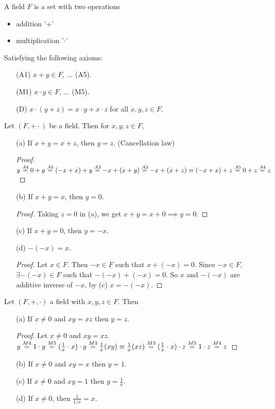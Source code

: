 \documentclass[]{article}
\begin{document}
\begin{definition}
	[Field] A field $F$ is a set with two operations
	\begin{itemize}
		\item addition '+'
		\item multiplication '$\cdot$'
	\end{itemize}
	Satisfying the following axioms:
	\begin{enumerate}
		\item[(A1)] $x+y \in F$, $\dots$ (A5).
		\item[(M1)] $x\cdot y \in F$, $\dots$ (M5).
		\item[(D)] $x\cdot(y+z) = x\cdot y + x\cdot z$ for all $x,y,z\in F$.
	\end{enumerate}
\end{definition}

\begin{proposition}
	\label{prop1.14}
	Let $(F,+\cdot)$ be a field. Then for $x,y,z\in F$,
	\begin{enumerate}
		\item[(a)] If $x+y = x+z$, then $y = z$. (Cancellation law)
		\begin{proof}
			$y \overset{A4}{=} 0+y \overset{A5}{=} (-x+x) + y \overset{A3}{=} -x+(x+y) \overset{A3}{=} -x+(x+z)\equiv (-x+x)+z \overset{A5}{=} 0+z \overset{A4}{=} z$
		\end{proof}
		\item[(b)] If $x+y = x$, then $y = 0$.
		\begin{proof}
			Taking $z=0$ in (a), we get $x+y = x+0 \implies y=0$.
		\end{proof}
		\item[(c)] If $x+y = 0$, then $y = -x$.
		\item[(d)] $-(-x)=x$.
		\begin{proof}
			Let $x\in F$. Then $-x\in F$ such that $x+(-x)=0$. Since $-x\in F$, $\exists -(-x)\in F$ such that $-(-x)+(-x)=0$. So $x$ and $-(-x)$ are additive inverse of $-x$, by (c) $x=-(-x)$.
		\end{proof}
	\end{enumerate}
\end{proposition}

\begin{proposition}
	Let $(F,+,\cdot)$ a field with $x,y,z\in F$. Then
	\begin{enumerate}
		\item[(a)] If $x\neq 0$ and $xy=xz$ then $y=z$.
		\begin{proof}
			Let $x\neq 0$ and $xy = xz$. $y \overset{M4}{=} 1\cdot y \overset{M5}{=} (\frac{1}{x}\cdot x)\cdot y \overset{M3}{=} \frac{1}{x}(xy) \equiv \frac{1}{x}(xz) \overset{M3}{=} (\frac{1}{x}\cdot x)\cdot z \overset{M5}{=} 1\cdot z \overset{M4}{=} z$
		\end{proof}
		\item[(b)] If $x\neq 0$ and $xy=x$ then $y=1$.
		\item[(c)] If $x\neq 0$ and $xy = 1$ then $y=\frac{1}{x}$.
		\item[(d)] If $x\neq 0$, then $\frac{1}{1/x} = x$.
	\end{enumerate}
\end{proposition}
\end{document}
